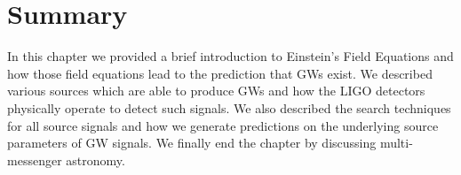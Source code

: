 \section{Summary}

In this chapter we provided a brief introduction to Einstein's 
Field Equations and how those field equations lead to the prediction 
that \ac{GW}s exist. We described various sources which are 
able to produce \ac{GW}s and how the \ac{LIGO} detectors physically operate 
to detect such signals. We also described the search techniques for 
all source signals and how we generate predictions on the underlying 
source parameters of \ac{GW} signals. We finally end the chapter by 
discussing multi-messenger astronomy.

